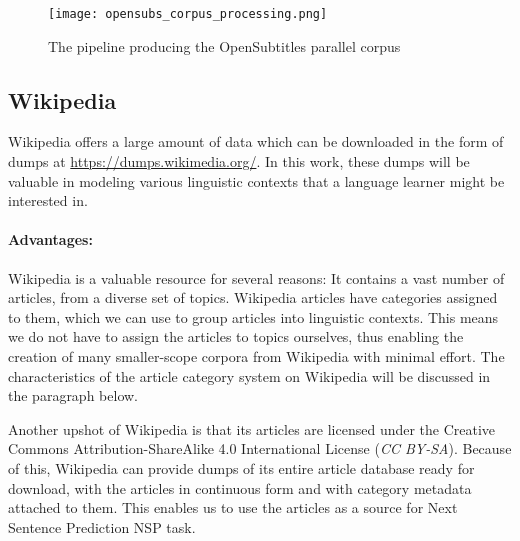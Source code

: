\begin{figure}[H]
	\centering
	\texttt{[image: opensubs\_corpus\_processing.png]}
	\caption{The pipeline producing the OpenSubtitles parallel corpus}
	\label{fig:opensubs pipeline}
\end{figure}

\subsection{Wikipedia}


Wikipedia offers a large amount of data which can be downloaded in the form of dumps at \url{https://dumps.wikimedia.org/}.
In this work, these dumps will be valuable in modeling various linguistic contexts that a language learner might be interested in.

\paragraph{Advantages:}
Wikipedia is a valuable resource for several reasons:
It contains a vast number of articles, from a diverse set of topics.
Wikipedia articles have categories assigned to them, which we can use to group articles into linguistic contexts.
This means we do not have to assign the articles to topics ourselves, thus enabling the creation of many smaller-scope corpora from Wikipedia with minimal effort.
The characteristics of the article category system on Wikipedia will be discussed in the paragraph below.

Another upshot of Wikipedia is that its articles are licensed under the Creative Commons Attribution-ShareAlike 4.0 International License (\textit{CC BY-SA}).
Because of this, Wikipedia can provide dumps of its entire article database ready for download, with the articles in continuous form and with category metadata attached to them.
This enables us to use the articles as a source for Next Sentence Prediction NSP task.

